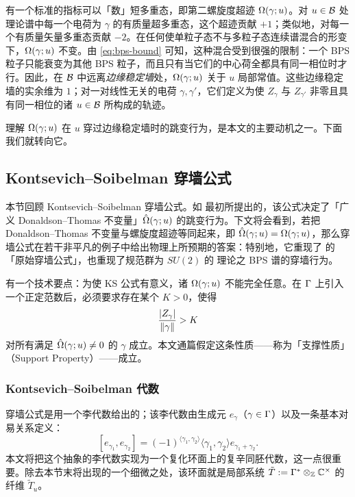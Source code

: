 有一个标准的指标可以「数」短多重态，即第二螺旋度超迹 $\Omega(\gamma;u)$。对 $u \in \mathcal{B}$ 处理论谱中每一个电荷为 $\gamma$ 的有质量超多重态，这个超迹贡献 $+1$；类似地，对每一个有质量矢量多重态贡献 $-2$。在任何使单粒子态不与多粒子态连续谱混合的形变下，$\Omega(\gamma;u)$ 不变。由 \eqref{eq:bps-bound} 可知，这种混合受到很强的限制：一个 BPS 粒子只能衰变为其他 BPS 粒子，而且只有当它们的中心荷全都具有同一相位时才行。因此，在 $\mathcal{B}$ 中远离\emph{边缘稳定墙}处，$\Omega(\gamma;u)$ 关于 $u$ 局部常值。这些边缘稳定墙的实余维为 $1$；对一对线性无关的电荷 $\gamma, \gamma'$，它们定义为使 $Z_\gamma$ 与 $Z_{\gamma'}$ 非零且具有同一相位的诸 $u\in \mathcal{B}$ 所构成的轨迹。

理解 $\Omega(\gamma;u)$ 在 $u$ 穿过边缘稳定墙时的跳变行为，是本文的主要动机之一。下面我们就转向它。

\subsection{Kontsevich--Soibelman 穿墙公式}
\label{sec:ReviewKS}

本节回顾 Kontsevich--Soibelman 穿墙公式。如 \cite{ks1} 最初所提出的，该公式决定了「广义 Donaldson--Thomas 不变量」$\hat{\Omega}(\gamma;u)$ 的跳变行为。下文将会看到，若把 Donaldson--Thomas 不变量与螺旋度超迹等同起来，即 $\hat{\Omega}(\gamma;u) = \Omega(\gamma;u)$，那么穿墙公式在若干非平凡的例子中给出物理上所预期的答案：特别地，它重现了 \cite{Denef:2007vg} 的「原始穿墙公式」，也重现了规范群为 $SU(2)$ 的 \SW 理论之 BPS 谱的穿墙行为。

有一个技术要点：为使 KS 公式有意义，诸 $\Omega(\gamma;u)$ 不能完全任意。在 $\Gamma$ 上引入一个正定范数后，必须要求存在某个 $K > 0$，使得
\begin{equation}
\frac{\lvert Z_\gamma \rvert}{\lVert \gamma \rVert} > K
\end{equation}
对所有满足 $\hat{\Omega}(\gamma;u) \neq 0$ 的 $\gamma$ 成立。本文通篇假定这条性质——称为「支撑性质」（Support Property）——成立。

\subsubsection*{Kontsevich--Soibelman 代数}

穿墙公式是用一个李代数给出的；该李代数由生成元 $e_\gamma$（$\gamma \in \Gamma$）以及一条基本对易关系定义：
\begin{equation} \label{eq:ks-commutator}
[e_{\gamma_1}, e_{\gamma_2}] = (-1)^{\langle
\gamma_1,\gamma_2\rangle} \langle \gamma_1,\gamma_2\rangle
e_{\gamma_1+\gamma_2}.
\end{equation}
本文将把这个抽象的李代数实现为一个复化环面上的复辛同胚代数，这一点很重要。除去本节末将出现的一个细微之处，该环面就是局部系统 $\tilde{T} := \Gamma^* \otimes_{\mathbb{Z}} \mathbb{C}^\times$ 的纤维 $\tilde{T}_u$。

